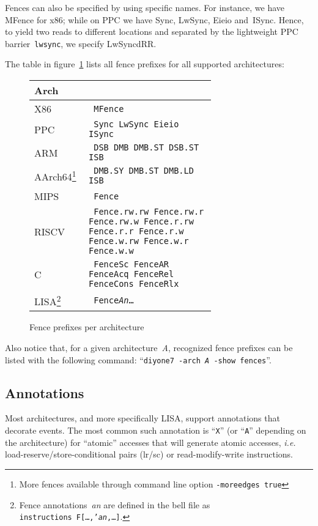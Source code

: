 Fences can also be specified by using specific names.
For instance, we have  MFence for x86;
while on PPC we have Sync, LwSync, Eieio and~ISync.
Hence, to yield two reads to different locations
and separated by the lightweight PPC barrier~\texttt{lwsync},
we specify LwSyncdRR.

The table in figure~\ref{fence:relax:fig} lists all fence prefixes
for all supported architectures:
\begin{figure}[h]
\caption{\label{fence:relax:fig}Fence prefixes per architecture}
\begin{center}
\begin{minipage}{0.9\linewidth}
\begin{center}
\begin{tabular}{l>{\tt}p{0.7\linewidth}}
Arch & \multicolumn{1}{c}{Fence prefixes} \\ \hline
X86 & MFence \\
PPC & Sync LwSync Eieio ISync \\
ARM & DSB DMB DMB.ST DSB.ST ISB \\
AArch64\footnote{More fences available through command line option \texttt{-moreedges true}}\qquad\qquad & DMB.SY DMB.ST DMB.LD ISB \\
MIPS & Fence \\
RISCV & Fence.rw.rw Fence.rw.r Fence.rw.w  Fence.r.rw Fence.r.r Fence.r.w
Fence.w.rw Fence.w.r Fence.w.w\\
C & FenceSc FenceAR FenceAcq FenceRel FenceCons FenceRlx\\
LISA\footnote{Fence annotations~\emph{an} are defined in the bell file as
\texttt{instructions~F[{\ldots,'\emph{an},\ldots}]}.}
 & Fence\emph{An}\ldots\\
\end{tabular}
\end{center}
\end{minipage}
\end{center}
\end{figure}
Also notice that, for a given architecture~\emph{A},
recognized fence prefixes can be listed with the following command:
``\texttt{diyone7 -arch \emph{A} -show fences}''.

\subsection{Annotations}

Most architectures, and more specifically LISA, support annotations that
decorate events. The most common such annotation is ``\texttt{X}'' (or ``\texttt{A}'' depending on the architecture)
for ``atomic'' accesses that will generate atomic accesses, \emph{i.e.}
load-reserve/store-conditional pairs (lr/sc) or read-modify-write instructions.

